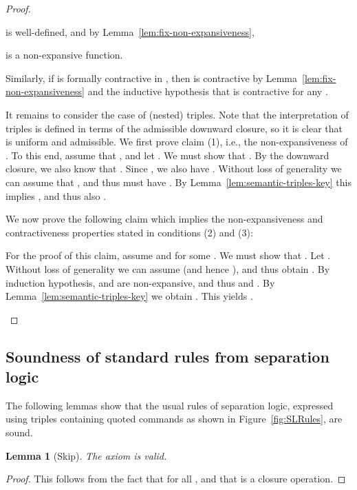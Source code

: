 \documentclass{LMCS}
\newtheorem{lemma}[theorem]{Lemma}
\theoremstyle{remark}
\begin{document}
\begin{figure*}[t]
\begin{proof}
\begin{iteMize}{}
 is well-defined, and by Lemma~\ref{lem:fix-non-expansiveness}, 

 is a non-expansive function. 

Similarly, if  is formally contractive in , then 
 is contractive by Lemma~\ref{lem:fix-non-expansiveness} and the inductive hypothesis that 
 is contractive for any . 

\item It remains to consider the case of (nested) triples. Note that the interpretation of triples is defined in terms of the admissible downward closure, so it is clear that  is uniform and admissible. 
We first prove claim (1), i.e., the non-expansiveness of .  
To this end, assume that , and let . We must show that . 
By the downward closure, we also know that . 
Since , we also have . Without loss of generality we can assume that , and thus must have 
. 
By Lemma~\ref{lem:semantic-triples-key} this implies  
, and thus also 
.

We now prove the following claim which implies the non-expansiveness and contractiveness properties stated in conditions (2) and (3):

For the proof of this claim, assume  and  for some . 
We must show that . 
Let . Without loss of generality we can assume  (and hence ), and thus obtain 
. 
By induction hypothesis,  and  are non-expansive, and thus
 and 
. 
By Lemma~\ref{lem:semantic-triples-key} we obtain 
. 
This yields .
\end{iteMize}
\end{proof}













\subsection{Soundness of standard rules from separation logic}
\label{app:subsec:HoareLogicRules}

The following lemmas show that the usual rules of separation logic, 
expressed using triples containing quoted commands as shown in Figure~\ref{fig:SLRules}, are sound. 

\begin{lemma}[Skip] 
The axiom  is valid. 
\end{lemma}

\begin{proof}
This follows from the fact that  for all , and that  is a closure operation. 
\end{proof}


\end{figure*}
\end{document}
